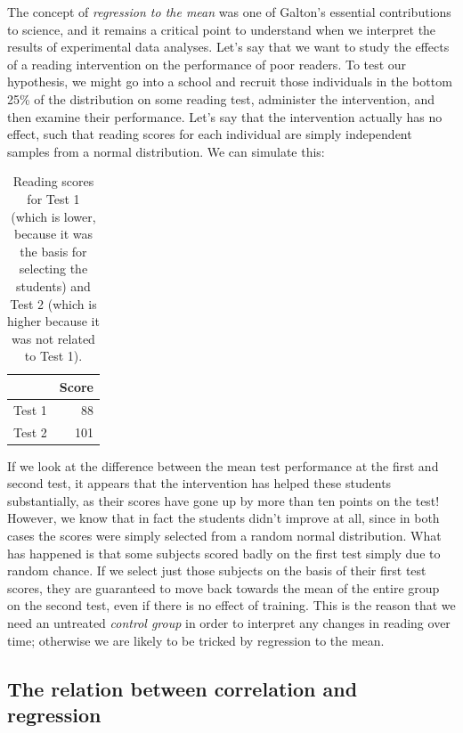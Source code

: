 \documentclass[12pt,]{book}
\theoremstyle{definition}
\theoremstyle{definition}
\theoremstyle{definition}
\theoremstyle{remark}
\begin{document}
The concept of \emph{regression to the mean} was one of Galton's essential contributions to science, and it remains a critical point to understand when we interpret the results of experimental data analyses. Let's say that we want to study the effects of a reading intervention on the performance of poor readers. To test our hypothesis, we might go into a school and recruit those individuals in the bottom 25\% of the distribution on some reading test, administer the intervention, and then examine their performance. Let's say that the intervention actually has no effect, such that reading scores for each individual are simply independent samples from a normal distribution. We can simulate this:

\begin{table}

\caption{\label{tab:unnamed-chunk-101}Reading scores for Test 1 (which is lower, because it was the basis for selecting the students) and Test 2 (which is higher because it was not related to Test 1).}
\centering
\begin{tabular}[t]{l|r}
\hline
  & Score\\
\hline
Test 1 & 88\\
\hline
Test 2 & 101\\
\hline
\end{tabular}
\end{table}

If we look at the difference between the mean test performance at the first and second test, it appears that the intervention has helped these students substantially, as their scores have gone up by more than ten points on the test! However, we know that in fact the students didn't improve at all, since in both cases the scores were simply selected from a random normal distribution. What has happened is that some subjects scored badly on the first test simply due to random chance. If we select just those subjects on the basis of their first test scores, they are guaranteed to move back towards the mean of the entire group on the second test, even if there is no effect of training. This is the reason that we need an untreated \emph{control group} in order to interpret any changes in reading over time; otherwise we are likely to be tricked by regression to the mean.

\hypertarget{the-relation-between-correlation-and-regression}{%
\subsection{The relation between correlation and regression}\label{the-relation-between-correlation-and-regression}}
\end{document}

